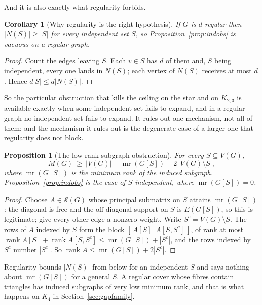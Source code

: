 \documentclass[11pt]{article}
\newtheorem{corollary}[theorem]{Corollary}
\newtheorem{proposition}[theorem]{Proposition}
\theoremstyle{definition}
\begin{document}
And it is also exactly what regularity forbids.

\begin{corollary}[Why regularity is the right hypothesis]\label{cor:regblocks}
If $G$ is $d$-regular then $|N(S)|\ge|S|$ for every independent set $S$, so
Proposition~\ref{prop:indobs} is vacuous on a regular graph.
\end{corollary}

\begin{proof}
Count the edges leaving $S$. Each $v\in S$ has $d$ of them and, $S$ being
independent, every one lands in $N(S)$; each vertex of $N(S)$ receives at most
$d$. Hence $d|S|\le d|N(S)|$.
\end{proof}

\noindent
So the particular obstruction that kills the ceiling on the star and on
$K_{2,3}$ is available exactly when some independent set fails to expand, and
in a regular graph no independent set fails to expand. It rules out one
mechanism, not all of them; and the mechanism it rules out is the degenerate
case of a larger one that regularity does not block.

\begin{proposition}[The low-rank-subgraph obstruction]\label{prop:lowrank}
For every $S\subseteq V(G)$,
\[
  M(G)\ \ge\ |V(G)|-\operatorname{mr}(G[S])-2\,|V(G)\setminus S| ,
\]
where $\operatorname{mr}(G[S])$ is the minimum rank of the induced subgraph.
Proposition~\ref{prop:indobs} is the case of $S$ independent, where
$\operatorname{mr}(G[S])=0$.
\end{proposition}

\begin{proof}
Choose $A\in\mathcal S(G)$ whose principal submatrix on $S$ attains
$\operatorname{mr}(G[S])$: the diagonal is free and the off-diagonal support on
$S$ is $E(G[S])$, so this is legitimate; give every other edge a nonzero weight.
Write $S^c=V(G)\setminus S$. The rows of $A$ indexed by $S$ form the block
$[\,A[S]\;\;A[S,S^c]\,]$, of rank at most
$\operatorname{rank}A[S]+\operatorname{rank}A[S,S^c]\le\operatorname{mr}(G[S])+|S^c|$,
and the rows indexed by $S^c$ number $|S^c|$. So
$\operatorname{rank}A\le\operatorname{mr}(G[S])+2|S^c|$.
\end{proof}

\noindent
Regularity bounds $|N(S)|$ from below for an independent $S$ and says nothing
about $\operatorname{mr}(G[S])$ for a general $S$. A regular cover whose fibres
contain triangles has induced subgraphs of very low minimum rank, and that is
what happens on $K_4$ in Section~\ref{sec:gapfamily}.
\end{document}

